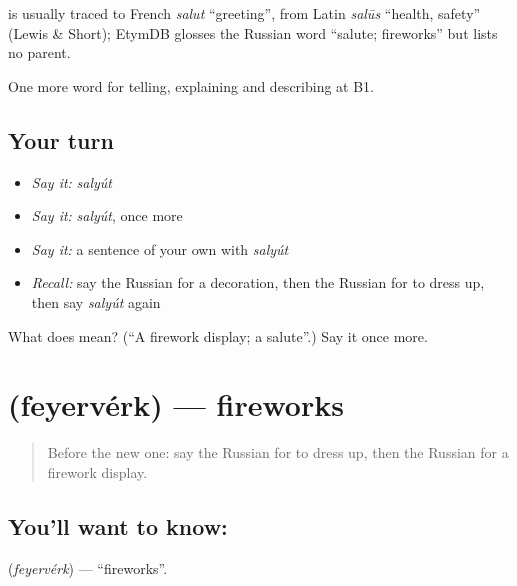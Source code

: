 \begin{cousinweb}
\emph{} is usually traced to French \emph{salut} \textquotedblleft{}greeting\textquotedblright{}, from Latin \emph{salūs} \textquotedblleft{}health, safety\textquotedblright{} (Lewis \& Short); EtymDB glosses the Russian word \textquotedblleft{}salute; fireworks\textquotedblright{} but lists no parent.
\end{cousinweb}

\begin{grammarlens}[title={What you've built}]
One more word for telling, explaining and describing at B1.
\end{grammarlens}

\subsection*{Your turn}
\begin{itemize}
\raggedright
  \item \emph{Say it:} \emph{salyút}
  \item \emph{Say it:} \emph{salyút}, once more
  \item \emph{Say it:} a sentence of your own with \emph{salyút}
  \item \emph{Recall:} say the Russian for a decoration, then the Russian for to dress up, then say \emph{salyút} again
\end{itemize}

\begin{tcolorbox}[breakable,colback=teal!4,colframe=teal!35!black,title={Before you move on}]
What does  mean? (\textquotedblleft{}A firework display; a salute\textquotedblright{}.) Say it once more.
\end{tcolorbox}
\section[\texorpdfstring{\ru{фейерверк} (feyervérk)}{фейерверк (feyervérk)}]{ (feyervérk) — fireworks}

\label{lesson:RU-C314-feyerverk}



\begin{quote}
Before the new one: say the Russian for to dress up, then the Russian for a firework display.
\end{quote}

\subsection*{You'll want to know: }
\textbf{} (\emph{feyervérk}) — \textquotedblleft{}fireworks\textquotedblright{}.

